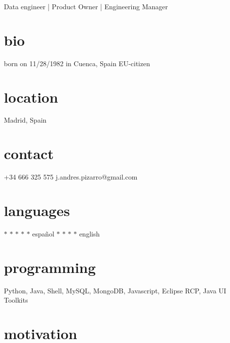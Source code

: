 \documentclass[]{friggeri-cv}
\begin{document}
       {Data engineer | Product Owner | Engineering Manager}



\begin{aside} %
  \section{bio}
  born on 11/28/1982
  in Cuenca, Spain
  EU-citizen
  \section{location}
  Madrid, Spain
  \section{contact}
  +34 666 325 575
  j.andres.pizarro@gmail.com
  \section{languages}
  {\color{lightgray} $\ast$}{\color{lightgray} $\ast$}{\color{lightgray} $\ast$}{\color{lightgray} $\ast$}{\color{lightgray} $\ast$} español
  {\color{lightgray} $\ast$}{\color{lightgray} $\ast$}{\color{lightgray} $\ast$}{\color{lightgray} $\ast$} english
  \section{programming}
  Python, Java, Shell,
  MySQL, MongoDB, Javascript,
  Eclipse RCP, Java UI Toolkits
\end{aside}


\section{motivation}
\end{document}

